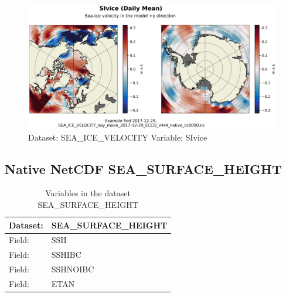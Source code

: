 \begin{figure}[H]
\centering
\includegraphics[width=\textwidth]{../images/plots/native_plots/Sea-Ice_Velocity/SIvice.png}
\caption{Dataset: SEA\_ICE\_VELOCITY Variable: SIvice}
\label{tab:table-SEA_ICE_VELOCITY_SIvice-Plot}
\end{figure}
\pagebreak
\subsection{Native NetCDF SEA\_SURFACE\_HEIGHT}
\newp
\begin{longtable}{|p{}|p{}|}
\caption{Variables in the dataset SEA\_SURFACE\_HEIGHT}
\label{tab:table-SEA_SURFACE_HEIGHT-fields} \\ 
\hline \endhead \hline \endfoot
\rowcolor{lightgray} \textbf{Dataset:} & \textbf{SEA\_SURFACE\_HEIGHT} \\ \hline
Field: &SSH \\ \hline
Field: &SSHIBC \\ \hline
Field: &SSHNOIBC \\ \hline
Field: &ETAN \\ \hline
\end{longtable}

\pagebreak
